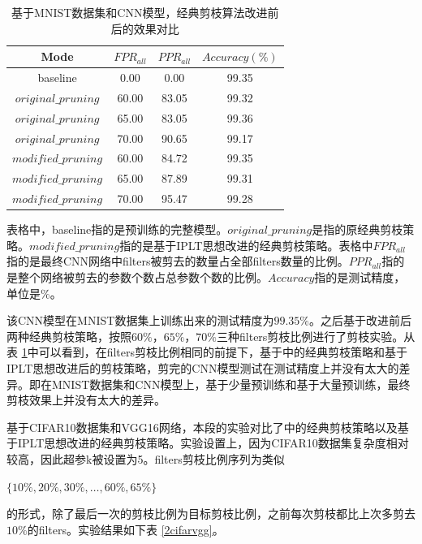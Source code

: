 \documentclass[ pdftex, oneside, master]{NJUthesis}
\begin{document}
\begin{table}[!htbp]
\caption{基于MNIST数据集和CNN模型，经典剪枝算法改进前后的效果对比}
\begin{tabular}{|c|c|c|c|}
\hline
{Mode} & {$FPR_{all}$} & $PPR_{all}$ & $Accuracy(\%)$ \\ \hline
baseline & 0.00 & 0.00 & 99.35 \\ \hline
$original\_pruning$ & 60.00 & 83.05 & 99.32 \\
$original\_pruning$  & 65.00 & 83.05 & 99.36 \\
$original\_pruning$  & 70.00 & 90.65 & 99.17 \\ \hline
$modified\_pruning$  & 60.00 & 84.72 & 99.35\\
$modified\_pruning$ & 65.00 & 87.89 & 99.31\\
$modified\_pruning$ & 70.00 & 95.47 & 99.28\\ \hline
\end{tabular}
\label{2mnist}
\end{table}

表格中，baseline指的是预训练的完整模型。$original\_pruning$是指的原经典剪枝策略\cite{17}。$modified\_pruning$指的是基于IPLT思想改进的经典剪枝策略。表格中$FPR_{all}$指的是最终CNN网络中filters被剪去的数量占全部filters数量的比例。$PPR_{all}$指的是整个网络被剪去的参数个数占总参数个数的比例。$Accuracy$指的是测试精度，单位是$\%$。

该CNN模型在MNIST数据集上训练出来的测试精度为$99.35\%$。之后基于改进前后两种经典剪枝策略，按照$60\%$，$65\%$，$70\%$三种filters剪枝比例进行了剪枝实验。从表 \ref{2mnist}中可以看到，在filters剪枝比例相同的前提下，基于\cite{17}中的经典剪枝策略和基于IPLT思想改进后的剪枝策略，剪完的CNN模型测试在测试精度上并没有太大的差异。即在MNIST数据集和CNN模型上，基于少量预训练和基于大量预训练，最终剪枝效果上并没有太大的差异。

基于CIFAR10数据集和VGG16网络，本段的实验对比了\cite{17}中的经典剪枝策略以及基于IPLT思想改进的经典剪枝策略。实验设置上，因为CIFAR10数据集复杂度相对较高，因此超参k被设置为5。filters剪枝比例序列为类似

$\{10\%, 20\%, 30\%, \dots, 60\%, 65\%\}$

\noindent 的形式，除了最后一次的剪枝比例为目标剪枝比例，之前每次剪枝都比上次多剪去$10\%$的filters。实验结果如下表 \ref{2cifarvgg}。
\end{document}
